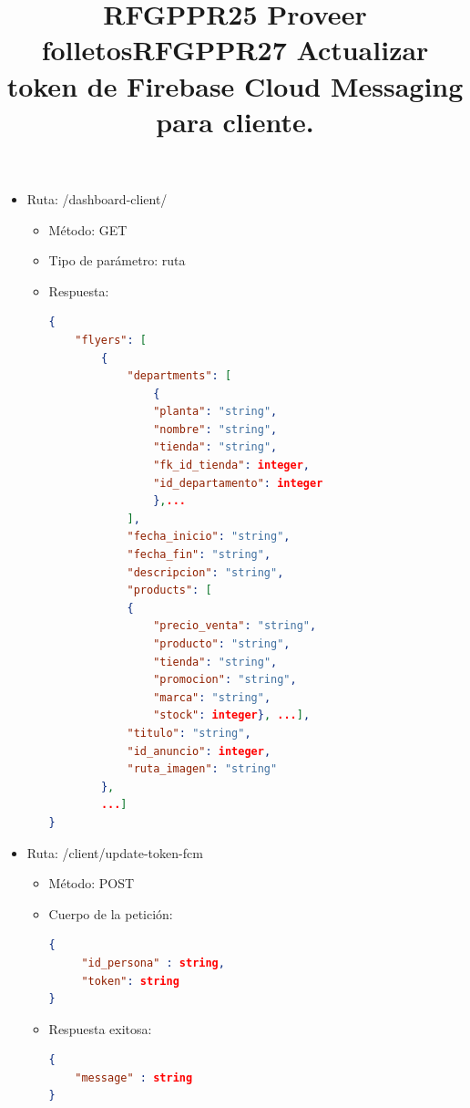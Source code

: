 
\title{\textbf{RFGPPR25 Proveer folletos}}
\begin{itemize}
\item Ruta: /dashboard-client/
\begin{itemize}
\item Método: GET
\item Tipo de parámetro: ruta
\item Respuesta: 
\begin{lstlisting}[language=json,firstnumber=1]
{
    "flyers": [
        {
            "departments": [
				{
				"planta": "string",
                "nombre": "string",
                "tienda": "string",
                "fk_id_tienda": integer,
                "id_departamento": integer
				},...
            ],
            "fecha_inicio": "string",
            "fecha_fin": "string",
            "descripcion": "string",
            "products": [
            {
            	"precio_venta": "string",
                "producto": "string",
                "tienda": "string",
                "promocion": "string",
                "marca": "string",
                "stock": integer}, ...],
            "titulo": "string",
            "id_anuncio": integer,
            "ruta_imagen": "string"
        },
        ...]
}
\end{lstlisting}
\end{itemize}
\end{itemize}


\title{\textbf{RFGPPR27 Actualizar token de Firebase Cloud Messaging para cliente.}}
\begin{itemize}
\item Ruta: /client/update-token-fcm
\begin{itemize}
\item Método: POST
\item Cuerpo de la petición: 
\begin{lstlisting}[language=json,firstnumber=1]
{
	 "id_persona" : string, 
	 "token": string
}
\end{lstlisting}
\item Respuesta exitosa: 
\begin{lstlisting}[language=json,firstnumber=1]
{
	"message" : string 
}
\end{lstlisting}
\end{itemize}
\end{itemize}


